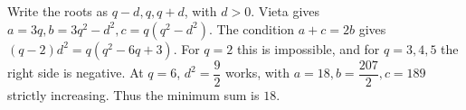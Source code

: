 Write the roots as $q-d,q,q+d$, with $d>0$. Vieta gives $a=3q,b=3q^2-d^2,c=q(q^2-d^2)$. The condition $a+c=2b$ gives $(q-2)d^2=q(q^2-6q+3)$. For $q=2$ this is impossible, and for $q=3,4,5$ the right side is negative. At $q=6$, $d^2 = \dfrac{9}{2}$ works, with $a = 18 , b = \dfrac{207}{2} , c = 189$ strictly increasing. Thus the minimum sum is $\boxed{18}$.
